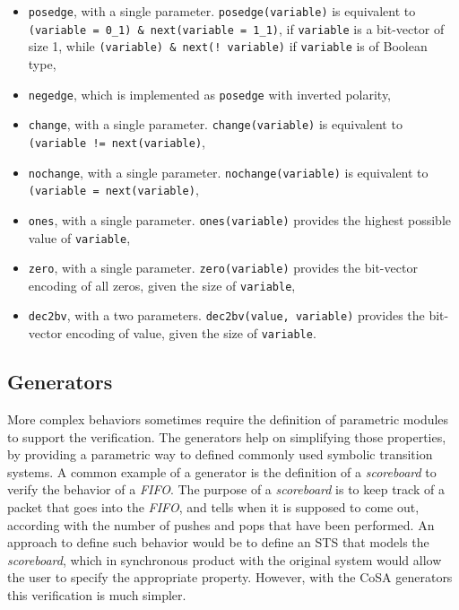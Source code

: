 \documentclass{article}
\theoremstyle{definition}
\begin{document}
\begin{itemize}
\item \texttt{posedge}, with a single
  parameter. \texttt{posedge(variable)} is equivalent to \texttt{(variable
    = 0\_1) \& next(variable = 1\_1)}, if \texttt{variable} is a
  bit-vector of size 1, while \texttt{(variable) \& next(! variable)} if
  \texttt{variable} is of Boolean type,
\item \texttt{negedge}, which is implemented as \texttt{posedge} with
  inverted polarity,
\item \texttt{change}, with a single
  parameter. \texttt{change(variable)} is equivalent to
  \texttt{(variable != next(variable)},
\item \texttt{nochange}, with a single
  parameter. \texttt{nochange(variable)} is equivalent to
  \texttt{(variable = next(variable)},
\item \texttt{ones}, with a single parameter. \texttt{ones(variable)}
  provides the highest possible value of \texttt{variable},
\item \texttt{zero}, with a single parameter. \texttt{zero(variable)}
  provides the bit-vector encoding of all zeros, given the size of
  \texttt{variable},
\item \texttt{dec2bv}, with a two parameters. \texttt{dec2bv(value,
  variable)} provides the bit-vector encoding of value, given the size
  of \texttt{variable}.
\end{itemize}

\subsection{Generators}

More complex behaviors sometimes require the definition of parametric
modules to support the verification. The generators help on
simplifying those properties, by providing a parametric way to defined
commonly used symbolic transition systems. A common example of a
generator is the definition of a \emph{scoreboard} to verify the
behavior of a \emph{FIFO}. The purpose of a \emph{scoreboard} is to
keep track of a packet that goes into the \emph{FIFO}, and tells when
it is supposed to come out, according with the number of pushes and
pops that have been performed. An approach to define such behavior
would be to define an STS that models the \emph{scoreboard}, which in
synchronous product with the original system would allow the user to
specify the appropriate property. However, with the CoSA generators
this verification is much simpler.
\end{document}
